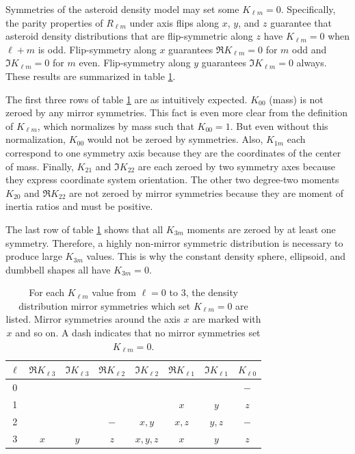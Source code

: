 \documentclass{aastex631}
\begin{document}
Symmetries of the asteroid density model may set some $K_{\ell m}=0$. Specifically, the parity properties of $R_{\ell m}$ under axis flips along $x$, $y$, and $z$ guarantee that asteroid density distributions that are flip-symmetric along $z$ have $K_{\ell m}=0$ when $\ell + m$ is odd. Flip-symmetry along $x$ guarantees $\Re K_{\ell m} = 0$ for $m$ odd and $\Im K_{\ell m} = 0$ for $m$ even. Flip-symmetry along $y$ guarantees $\Im K_{\ell m} = 0$ always. These results are summarized in table \ref{tab:symmetries}.

The first three rows of table \ref{tab:symmetries} are as intuitively expected. $K_{00}$ (mass) is not zeroed by any mirror symmetries. This fact is even more clear from the definition of $K_{\ell m}$, which normalizes by mass such that $K_{00}=1$. But even without this normalization, $K_{00}$ would not be zeroed by symmetries. Also, $K_{1m}$ each correspond to one symmetry axis because they are the coordinates of the center of mass. Finally, $K_{21}$ and $\Im K_{22}$ are each zeroed by two symmetry axes because they express coordinate system orientation. The other two degree-two moments $K_{20}$ and $\Re K_{22}$ are not zeroed by mirror symmetries because they are moment of inertia ratios and must be positive.

The last row of table \ref{tab:symmetries} shows that all $K_{3m}$ moments are zeroed by at least one symmetry. Therefore, a highly non-mirror symmetric distribution is necessary to produce large $K_{3m}$ values. This is why the constant density sphere, ellipsoid, and dumbbell shapes all have $K_{3m} = 0$.

\begin{table}
  \centering
  \begin{tabular}{c|ccccccc}
    \hline\hline
    $\ell$ & $\Re K_{\ell 3}$ & $\Im K_{\ell 3}$ & $\Re K_{\ell 2}$ & $\Im K_{\ell 2}$ & $\Re K_{\ell 1}$ & $\Im K_{\ell 1}$ & $K_{\ell 0}$ \\ \hline
    0&   &   &   &   &   &   &$-$\\
    1&   &   &   &   &$x$&$y$&$z$\\
    2&   &   &$-$&$x,y$&$x,z$&$y,z$&$-$\\
    3&$x$&$y$&$z$&$x,y,z$&$x$&$y$&$z$\\ \hline \hline
  \end{tabular}
  \caption{For each $K_{\ell m}$ value from $\ell = 0$ to 3, the density distribution mirror symmetries which set $K_{\ell m} = 0$ are listed. Mirror symmetries around the axis $x$ are marked with $x$ and so on. A dash indicates that no mirror symmetries set $K_{\ell m} = 0$.}
  \label{tab:symmetries}
\end{table}
\end{document}
